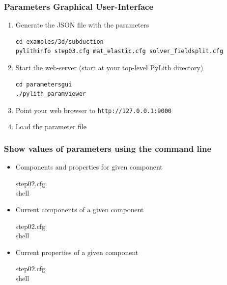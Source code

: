 \documentclass{beamer}
\begin{document}
\begin{frame}[fragile]
  \frametitle{Parameters Graphical User-Interface}

\begin{enumerate}
\item Generate the JSON file with the parameters
\begin{lstlisting}
cd examples/3d/subduction
pylithinfo step03.cfg mat_elastic.cfg solver_fieldsplit.cfg
\end{lstlisting}
\item Start the web-server (start at your top-level PyLith directory)
\begin{lstlisting}
cd parametersgui
./pylith_paramviewer
\end{lstlisting}
\item Point your web browser to {\tt http://127.0.0.1:9000}
\item Load the parameter file
\end{enumerate}

\end{frame}


\begin{frame}
  \frametitle{Show values of parameters using the command line}

  \begin{itemize}
  \item Components and properties for given component 
    \begin{description}
    \item[step02.cfg] 
    \item[shell] 
    \end{description}
  \item Current components of a given component 
    \begin{description}
    \item[step02.cfg] 
    \item[shell] 
    \end{description}
  \item Current properties of a given component 
    \begin{description}
    \item[step02.cfg] 
    \item[shell] 
    \end{description}
  \end{itemize}

\end{frame}
\end{document}
